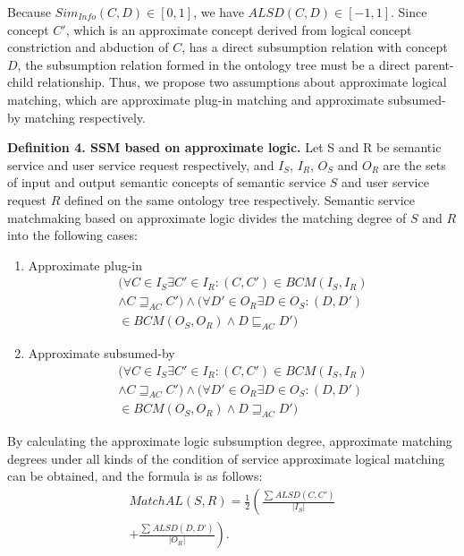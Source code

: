 \documentclass{ieeeaccess}
\begin{document}
Because $Si{{m}_{Info}}\left( C,D \right)\in \left[ 0,1 \right]$, we have $ALSD\left( C,D \right)\in \left[ -1,1 \right]$.
Since concept $C'$, which is an approximate concept derived from logical concept constriction and abduction of $C$, has a direct subsumption relation with concept $D$, the subsumption relation formed in the ontology tree must be a direct parent-child relationship. Thus, we propose two assumptions about approximate logical matching, which are approximate plug-in matching and approximate subsumed-by matching respectively.

\textbf{Definition 4. SSM based on approximate logic.} Let S and R be semantic service and user service request respectively, and $I_{S}$, $I_{R}$, $O_{S}$ and $O_{R}$ are the sets of input and output semantic concepts of semantic service $S$ and user service request $R$ defined on the same ontology tree respectively. Semantic service matchmaking based on approximate logic divides the matching degree of $S$ and $R$ into the following cases:

\begin{enumerate}
\item Approximate plug-in
\begin{align}
( \forall C\in I_{S}\exists {C}'\in I_{R}:( C,{C}' )\in BCM( I_{S},I_{R} )\nonumber\\
\wedge C{{\sqsupseteq }_{AC}}{C}')\wedge( \forall {D}'\in O_{R}\exists D\in O_{S}:( D,{D}' )\nonumber\\
\in BCM( O_{S},O_{R} )\wedge D{{\sqsubseteq }_{AC}}{D}')
\end{align}

\item Approximate subsumed-by
\begin{align}
( \forall C\in I_{S}\exists {C}'\in I_{R}:( C,{C}' )\in BCM( I_{S},I_{R} )\nonumber\\
\wedge C{{\sqsupseteq }_{AC}}{C}')\wedge( \forall {D}'\in O_{R}\exists D\in O_{S}:( D,{D}' )\nonumber\\
\in BCM( O_{S},O_{R} )\wedge D{{\sqsupseteq }_{AC}}{D}')
\end{align}
\end{enumerate}

By calculating the approximate logic subsumption degree, approximate matching degrees under all kinds of the condition of service approximate logical matching can be obtained, and the formula is as follows:
\begin{align}
MatchAL( S,R )=\frac{1}{2} \left( \frac{\mathop{\sum }^{}ALSD( C,{C}')}{|I_{S}|}\right.\nonumber\\
+\left.\frac{\mathop{\sum }^{}ALSD( D,{D}' )}{| O_{R} |} \right).
\end{align}
\end{document}

